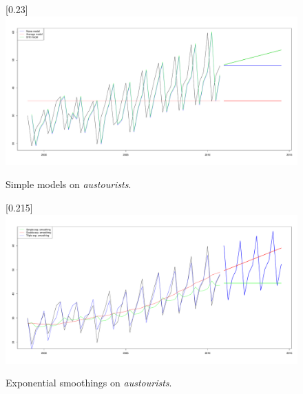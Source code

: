     \begin{figure}[H]
        \begin{center}
            \scalebox{0.255}[0.23]{\includegraphics{img/simple-models.pdf}}
            \caption{Simple models on \emph{austourists}.}
            \label{img:simple-models}
        \end{center}
    \end{figure}

    \begin{figure}[H]
        \begin{center}
            \scalebox{0.255}[0.215]{\includegraphics{img/exp-smoothings.pdf}}
            \caption{Exponential smoothings on \emph{austourists}.}
            \label{img:exp-smoothings}
        \end{center}
    \end{figure}

